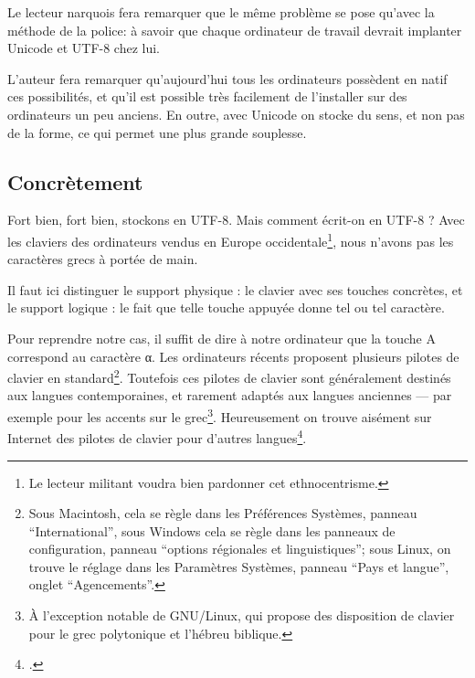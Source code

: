 \begin{plusloins}Le lecteur narquois fera remarquer que le même problème  se pose qu'avec la méthode de la police: à savoir que chaque ordinateur de travail devrait implanter Unicode et UTF-8 chez lui. 

L'auteur fera remarquer qu'aujourd'hui tous les ordinateurs possèdent en natif ces possibilités, et qu'il est possible très facilement de l'installer sur des ordinateurs un peu anciens. En outre, avec Unicode on stocke du sens, et non pas de la forme, ce qui permet une plus grande souplesse. 

\end{plusloins}

\subsection{Concrètement}

Fort bien, fort bien, stockons en UTF-8. Mais comment écrit-on en UTF-8 ? Avec les claviers des ordinateurs vendus en Europe occidentale\footnote{Le lecteur militant voudra bien pardonner cet ethnocentrisme.}, nous n'avons pas les caractères grecs à portée de main.

Il faut ici distinguer le support physique : le clavier avec ses touches concrètes, et le support logique : le fait que telle touche appuyée donne tel ou tel caractère. 

Pour reprendre notre cas, il suffit de dire à notre ordinateur que la touche A correspond au caractère α. Les ordinateurs récents proposent plusieurs pilotes de clavier en standard\footnote{Sous Macintosh, cela se règle dans les Préférences Systèmes, panneau \enquote{International}, sous Windows cela se règle dans les panneaux de configuration, panneau \enquote{options régionales et linguistiques}; sous Linux, on trouve le réglage dans les Paramètres Systèmes, panneau \enquote{Pays et langue}, onglet \enquote{Agencements}.}. Toutefois ces pilotes de clavier sont généralement destinés aux langues contemporaines, et rarement adaptés aux langues anciennes --- par exemple pour les accents sur le grec\footnote{À l'exception notable de GNU/Linux, qui propose des disposition de clavier pour le grec polytonique et l'hébreu biblique.}. Heureusement on trouve aisément sur Internet des pilotes de clavier pour d'autres langues\footcites[Pour ce qui concerne le grec ancien, le syriaque, l'hébreu ancien, on pourra utiliser les claviers proposés par Michel Langlois: ][]{clavierLanglois}[ou encore, pour le grec, les pilotes de l'École Normale Supérieure][]{clavierENS}.


